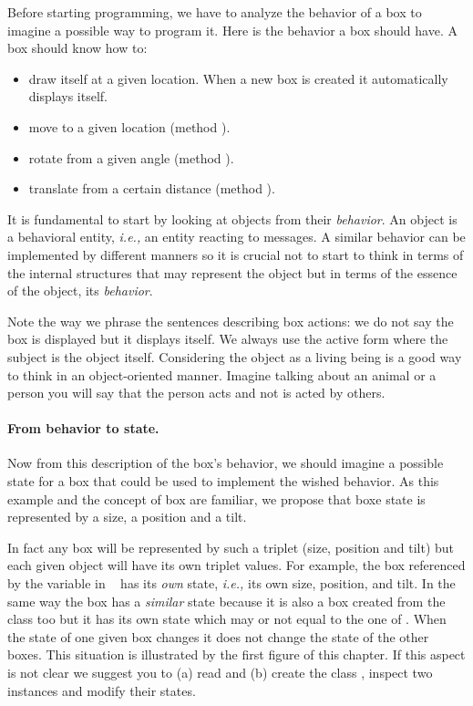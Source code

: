 Before starting programming, we have to analyze the behavior of a box 
to imagine a possible way to program it. Here is the 
behavior a box should have. A box should know how to:

\begin{itemize}
\item draw itself at a given location. When a new box is created it 
 automatically displays itself. 
\item move to a given location (method ).
\item rotate from a given angle (method ).
\item translate from a certain distance (method ).
\end{itemize}



It is fundamental to start by looking at objects from their
\emph{behavior}.  An object is a behavioral entity, \emph{i.e.,} an
entity reacting to messages.  A similar behavior can be implemented by
different manners so it is crucial not to start to think in terms of
the internal structures that may represent the object but in
terms of the essence of the object, its \emph{behavior}.
  
\begin{teacher}   
Note the way we phrase the sentences describing box actions:  we do
not say the box is displayed but it displays itself.  We always use
the active form where the subject is the object itself.  Considering
the object as a living being is a good way to think in an
object-oriented manner.  Imagine talking about an animal or a person
you will say that the person acts and not is acted by others.  
\end{teacher}


\paragraph{From behavior to state.} Now from this description of the
box's behavior, we should imagine a possible state for a box that
could be used to implement the wished behavior.  As this example and
the concept of box are familiar, we propose that boxe state is
represented by a size, a position and a tilt.

In fact any box will be represented by such a triplet (size, position
and tilt) but each given object will have its own triplet values.  For
example, the box referenced by the variable  in
~ has its \emph{own} state, \emph{i.e.,} its own
size, position, and tilt.  In the same way the box  has a
\emph{similar} state because it is also a box created from the class
 too but it has its own state which may or not equal to the
one of .  When the state of one given box changes it does not
change the state of the other boxes.  This situation is illustrated by
the first figure of this chapter.  If this aspect is not clear we
suggest you to (a) read  and (b) create the class
, inspect two instances and modify their states.



